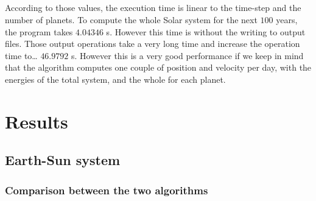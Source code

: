 \documentclass[a4paper, twoside, 11pt]{report}
\theoremstyle{theorem}
\theoremstyle{remark}
\theoremstyle{exemple}
\begin{document}
        \paragraph{}According to those values, the execution time is linear to the time-step and the number of planets. To compute the whole Solar system for the next $100$ years, the program takes $4.04346$ s. However this time is without the writing to output files. Those output operations take a very long time and increase the operation time to… $46.9792$ s. However this is a very good performance if we keep in mind that the algorithm computes one couple of position and velocity per day, with the energies of the total system, and the whole for each planet.


    

\chapter{Results}
    \section{Earth-Sun system}
        \subsection{Comparison between the two algorithms}
\end{document}
